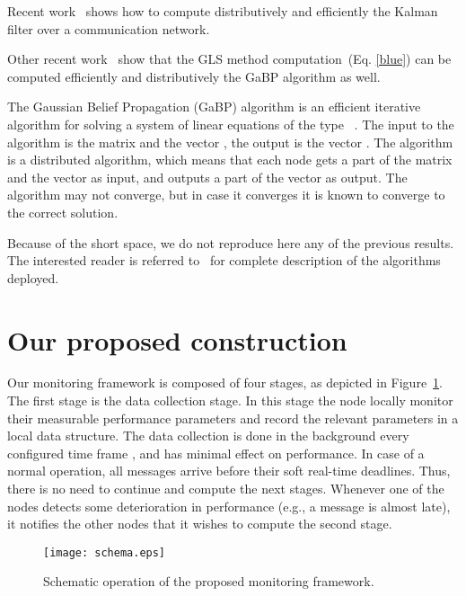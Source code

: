 \documentclass[times, 10pt,twocolumn]{article}
\begin{document}
\label{sec:gabp}
Recent work~\cite{Allerton08-2} shows how to compute distributively and efficiently the Kalman filter over a communication network.


Other recent work~\cite{Allerton,ISIT1,ISIT2} show that the GLS method computation~(Eq. \ref{blue}) can be computed efficiently and distributively the GaBP algorithm as well.


The Gaussian Belief Propagation (GaBP) algorithm is an efficient iterative algorithm for solving a system
of linear equations of the type ~\cite{ISIT1}. The input to the algorithm is the matrix  and the vector , the output is the vector . The algorithm is a distributed algorithm, which means that each node gets a part of the matrix  and the vector 
as input, and outputs a part of the vector  as output. The algorithm may not converge, but in case it converges
it is known to converge to the correct solution.

Because of the short space, we do not reproduce here any of the previous results. The interested reader is referred
to~\cite{Allerton08-2,ISIT1,ISIT2,Allerton} for complete description of the algorithms deployed.




\section{Our proposed construction}
\label{sec:const}
Our monitoring framework is composed of four stages, as depicted in Figure~\ref{fig:schema}. 
The first stage is the data collection stage. In this stage the node locally monitor their measurable performance
parameters and record the relevant parameters in a local data structure. The data collection is done in the background every
configured time frame , and has minimal effect on performance. In case of a normal operation, all messages
arrive before their soft real-time deadlines. Thus, there is no need to continue and compute the next stages.
Whenever one of the nodes detects some deterioration in performance (e.g., a message is almost late), it notifies the other nodes that it wishes to compute the second stage.

\begin{figure}[ht!]
\begin{center}
\texttt{[image: schema.eps]}\\
  \caption{Schematic operation of the proposed monitoring framework.}\label{fig:schema}
\end{center}
\end{figure}
\end{document}
